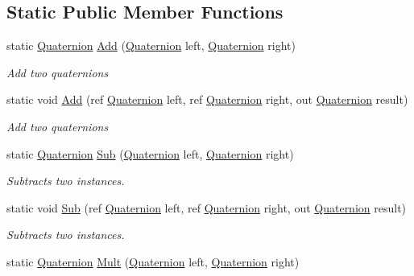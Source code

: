 \subsection*{Static Public Member Functions}
\begin{DoxyCompactItemize}
\item 
static \hyperlink{struct_open_t_k_1_1_quaternion}{Quaternion} \hyperlink{struct_open_t_k_1_1_quaternion_a7de4c42bb87e78a0e6b1dfee623d8fc7}{Add} (\hyperlink{struct_open_t_k_1_1_quaternion}{Quaternion} left, \hyperlink{struct_open_t_k_1_1_quaternion}{Quaternion} right)
\begin{DoxyCompactList}\small\item\em Add two quaternions \end{DoxyCompactList}\item 
static void \hyperlink{struct_open_t_k_1_1_quaternion_a02cbc83e73f0daefba3e77beb45c5e5a}{Add} (ref \hyperlink{struct_open_t_k_1_1_quaternion}{Quaternion} left, ref \hyperlink{struct_open_t_k_1_1_quaternion}{Quaternion} right, out \hyperlink{struct_open_t_k_1_1_quaternion}{Quaternion} result)
\begin{DoxyCompactList}\small\item\em Add two quaternions \end{DoxyCompactList}\item 
static \hyperlink{struct_open_t_k_1_1_quaternion}{Quaternion} \hyperlink{struct_open_t_k_1_1_quaternion_ab1ddf04d6cf86e470cf1aa75147c143a}{Sub} (\hyperlink{struct_open_t_k_1_1_quaternion}{Quaternion} left, \hyperlink{struct_open_t_k_1_1_quaternion}{Quaternion} right)
\begin{DoxyCompactList}\small\item\em Subtracts two instances. \end{DoxyCompactList}\item 
static void \hyperlink{struct_open_t_k_1_1_quaternion_ad8bf2c580b06268b9e1c45aea27b8c52}{Sub} (ref \hyperlink{struct_open_t_k_1_1_quaternion}{Quaternion} left, ref \hyperlink{struct_open_t_k_1_1_quaternion}{Quaternion} right, out \hyperlink{struct_open_t_k_1_1_quaternion}{Quaternion} result)
\begin{DoxyCompactList}\small\item\em Subtracts two instances. \end{DoxyCompactList}\item 
static \hyperlink{struct_open_t_k_1_1_quaternion}{Quaternion} \hyperlink{struct_open_t_k_1_1_quaternion_a1f38c4a06ba31f9f862b5dc57494dd39}{Mult} (\hyperlink{struct_open_t_k_1_1_quaternion}{Quaternion} left, \hyperlink{struct_open_t_k_1_1_quaternion}{Quaternion} right)

\end{DoxyCompactItemize}
